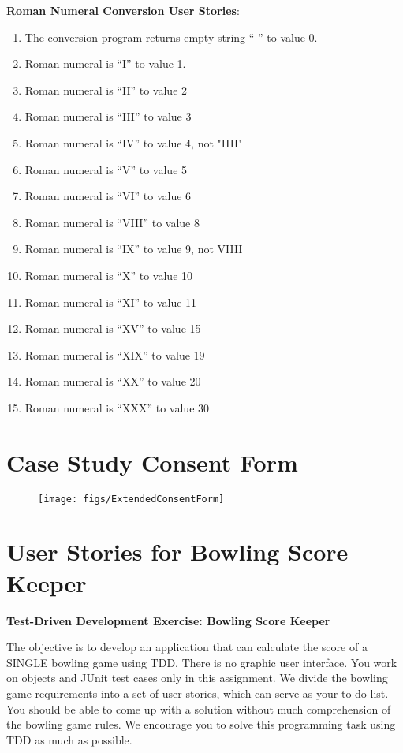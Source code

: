 \noindent \textbf{Roman Numeral Conversion User Stories}:
\begin{enumerate} 
  \item The conversion program returns empty string `` '' to value 0.
  \item Roman numeral is ``I'' to value 1.
  \item Roman numeral is ``II'' to value 2
  \item Roman numeral is ``III'' to value 3
  \item Roman numeral is ``IV'' to value 4, not "IIII"
  \item Roman numeral is ``V'' to value 5
  \item Roman numeral is ``VI'' to value 6
  \item Roman numeral is ``VIII'' to value 8
  \item Roman numeral is ``IX'' to value 9, not VIIII
  \item Roman numeral is ``X'' to value 10
  \item Roman numeral is ``XI'' to value 11
  \item Roman numeral is ``XV'' to value 15
  \item Roman numeral is ``XIX'' to value 19
  \item Roman numeral is ``XX'' to value 20
  \item Roman numeral is ``XXX'' to value 30 
\end{enumerate}

\chapter{Case Study Consent Form}
\label{app:CaseStudyConsentForm}

\begin{figure}[htbp]
  \centering
  \texttt{[image: figs/ExtendedConsentForm]}
\end{figure}

\chapter{User Stories for Bowling Score Keeper}
\label{app:UserStoriesBSK}
\clearpage
\begin{center}
\LARGE{\textbf{Test-Driven Development Exercise: Bowling Score Keeper}}
\end{center}

The objective is to develop an application that can calculate the score
of a SINGLE bowling game using TDD. There is no graphic user
interface. You work on objects and JUnit test cases only in this
assignment. We divide the bowling game requirements into a set of user
stories, which can serve as your to-do list. You should be able to
come up with a solution without much comprehension of the bowling game
rules. We encourage you to solve this programming task using TDD as much
as possible.

